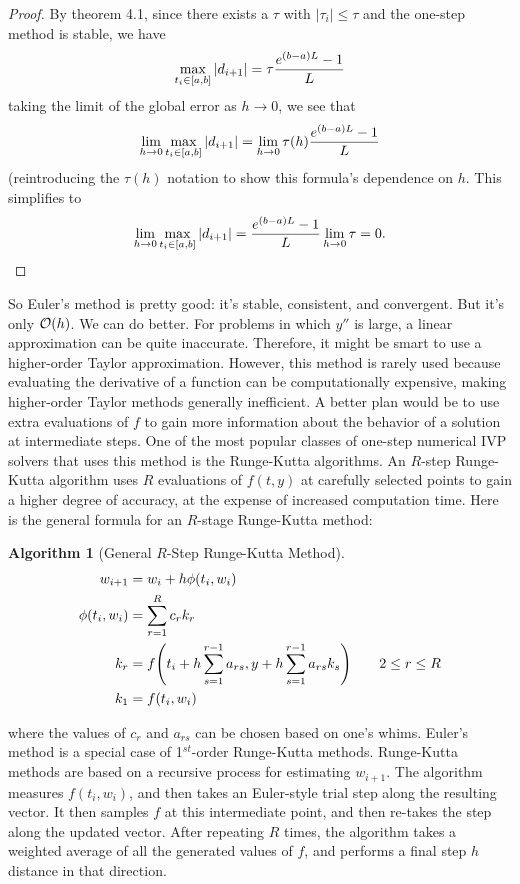\documentclass{article}
\newtheorem{algorithm}{Algorithm}[section]
\newcommand{\0}{\vb{0}}
\begin{document}
\begin{proof}
  By theorem 4.1, since there exists a $\tau$ with $|\tau_{i}| \leq \tau$ and the one-step method is stable, we have
  \[\max_{t_i \in [a, b]}\qty|d_{i+1}| = \tau\frac{e^{(b-a)L} - 1}{L}\]
  taking the limit of the global error as $h\to0$, we see that
  \[\lim_{h\to0}\max_{t_i \in [a, b]}\qty|d_{i+1}| = \lim_{h\to0}\tau(h)\frac{e^{(b-a)L} - 1}{L}\]
  (reintroducing the $\tau(h)$ notation to show this formula's dependence on $h$. This simplifies to
  \[\lim_{h\to0}\max_{t_i \in [a, b]}\qty|d_{i+1}| = \frac{e^{(b-a)L} - 1}{L}\lim_{h\to0}\tau = 0.\qedhere\]
\end{proof}

So Euler's method is pretty good: it's stable, consistent, and convergent. But it's only $\order{h}$. We can do better. For problems in which $y''$ is large, a linear approximation can be quite inaccurate. Therefore, it might be smart to use a higher-order Taylor approximation. However, this method is rarely used because evaluating the derivative of a function can be computationally expensive, making higher-order Taylor methods generally inefficient. A better plan would be to use extra evaluations of $f$ to gain more information about the behavior of a solution at intermediate steps. One of the most popular classes of one-step numerical IVP solvers that uses this method is the Runge-Kutta algorithms. An $R$-step Runge-Kutta algorithm uses $R$ evaluations of $f(t, y)$ at carefully selected points to gain a higher degree of accuracy, at the expense of increased computation time. Here is the general formula for an $R$-stage Runge-Kutta method:
\begin{algorithm}[General $R$-Step Runge-Kutta Method]
  \begin{align*}
    w_{i+1} & = w_i + h\phi(t_i, w_i) \\
    \phi(t_i, w_i) & = \sum_{r=1}^Rc_rk_r \\
    k_r & = f\qty(t_i + h\sum_{s=1}^{r-1}a_{rs}, y + h\sum_{s=1}^{r-1}a_{rs}k_s) \qquad 2 \leq r \leq R \\
    k_1 & = f(t_i, w_i)
  \end{align*}
\end{algorithm}
where the values of $c_r$ and $a_{rs}$ can be chosen based on one's whims. Euler's method is a special case of 1$^{st}$-order Runge-Kutta methods. Runge-Kutta methods are based on a recursive process for estimating $w_{i+1}$. The algorithm measures $f(t_i, w_i)$, and then takes an Euler-style trial step along the resulting vector. It then samples $f$ at this intermediate point, and then re-takes the step along the updated vector. After repeating $R$ times, the algorithm takes a weighted average of all the generated values of $f$, and performs a final step $h$ distance in that direction.
\end{document}
